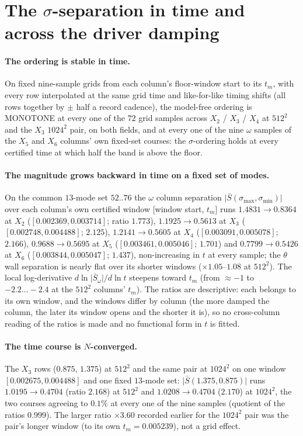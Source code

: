 \documentclass[11pt,a4paper]{article}
\newcommand{\abs}[1]{\lvert #1 \rvert}
\newcommand{\tm}{t_m}
\newcommand{\Sbar}{\bar S}
\begin{document}
\section{The \texorpdfstring{$\sigma$}{sigma}-separation in time and across the driver damping}\label{sec:course}

\paragraph{The ordering is stable in time.} On fixed nine-sample grids from each column's floor-window start to its $\tm$, with every row interpolated at the same grid time and like-for-like timing shifts (all rows together by $\pm$ half a record cadence), the model-free ordering is MONOTONE at every one of the $72$ grid samples across $X_2$ / $X_3$ / $X_4$ at $512^2$ and the $X_3$ $1024^2$ pair, on both fields, and at every one of the nine $\omega$ samples of the $X_5$ and $X_6$ columns' own fixed-set courses: the $\sigma$-ordering holds at every certified time at which half the band is above the floor.

\paragraph{The magnitude grows backward in time on a fixed set of modes.} On the common $13$-mode set $52..76$ the $\omega$ column separation $\abs{\Sbar(\sigma_{\max},\sigma_{\min})}$ over each column's own certified window [window start, $\tm$] runs $1.4831\to0.8364$ at $X_2$ ($[0.002369,0.003714]$; ratio $1.773$), $1.1925\to0.5613$ at $X_3$ ($[0.002748,0.004488]$; $2.125$), $1.2141\to0.5605$ at $X_4$ ($[0.003091,0.005078]$; $2.166$), $0.9688\to0.5695$ at $X_5$ ($[0.003461,0.005046]$; $1.701$) and $0.7799\to0.5426$ at $X_6$ ($[0.003844,0.005047]$; $1.437$), non-increasing in $t$ at every sample; the $\theta$ wall separation is nearly flat over its shorter windows ($\times1.05$--$1.08$ at $512^2$). The local log-derivative $d\ln\abs{\Sbar_\omega}/d\ln t$ steepens toward $\tm$ (from $\approx-1$ to $-2.2\dots-2.4$ at the $512^2$ columns' $\tm$). The ratios are descriptive: each belongs to its own window, and the windows differ by column (the more damped the column, the later its window opens and the shorter it is), so no cross-column reading of the ratios is made and no functional form in $t$ is fitted.

\paragraph{The time course is $N$-converged.} The $X_3$ rows ($0.875$, $1.375$) at $512^2$ and the same pair at $1024^2$ on one window $[0.002675,0.004488]$ and one fixed $13$-mode set: $\abs{\Sbar(1.375,0.875)}$ runs $1.0195\to0.4704$ (ratio $2.168$) at $512^2$ and $1.0208\to0.4704$ ($2.170$) at $1024^2$, the two courses agreeing to $0.1\%$ at every one of the nine samples (quotient of the ratios $0.999$). The larger ratio $\times3.60$ recorded earlier for the $1024^2$ pair was the pair's longer window (to its own $\tm=0.005239$), not a grid effect.
\end{document}
